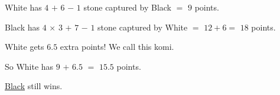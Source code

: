 \documentclass[a4paper,12pt]{extarticle}
\begin{document}
{\begin{center}
  {\Large White has \ul{$4$} $+$ \ul{$6$} $-$ \ul{$1$} stone captured by Black $=$ \ul{$9$} points.

    Black has \ul{$4$} $\times$ \ul{$3$} $+$ \ul{$7$} $-$ \ul{$1$} stone captured by White $=$ $12 + 6 =$ \ul{$18$} points.
  }

  \vspace{0.25cm}
  
  {\Large White gets $6.5$ extra points! We call this komi.

  So White has \ul{$9$} $+$ \ul{$6.5$} $=$ \ul{$15.5$} points.

  \ul{Black} still wins.}


  



\end{center}}
\end{document}
